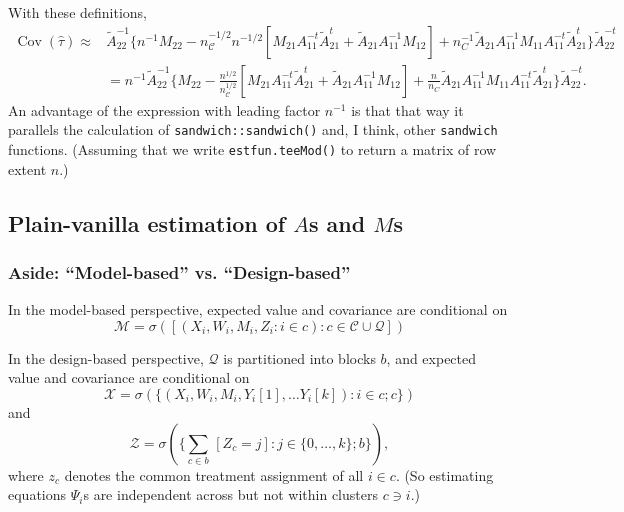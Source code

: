 \documentclass{article}
\begin{document}
With these definitions,
\begin{align}
  \operatorname{Cov}(\hat\tau) \approx& \tilde{A}_{22}^{-1}\{n^{-1} M_{22} -
                                 n_{\mathcal{C}}^{-1/2}n^{-1/2}[M_{21}A_{11}^{-t}\tilde{A}_{21}^t
                                 + \tilde{A}_{21}A_{11}^{-1}M_{12}] +
                                 n_C^{-1}\tilde{A}_{21}A_{11}^{-1}M_{11}A_{11}^{-t}\tilde{A}_{21}^{t}\}\tilde{A}_{22}^{-t}\nonumber
  \\
                               &= n^{-1}\tilde{A}_{22}^{-1}\{
                                 M_{22} -
                                 \frac{n^{1/2}}{n_{\mathcal{C}}^{1/2}}[M_{21}A_{11}^{-t}\tilde{A}_{21}^t
                                 + \tilde{A}_{21}A_{11}^{-1}M_{12}] +
                                 \frac{n}{n_C}\tilde{A}_{21}A_{11}^{-1}M_{11}A_{11}^{-t}\tilde{A}_{21}^{t}\}\tilde{A}_{22}^{-t}
                                . \label{eq:6}
\end{align}
An advantage of the expression with leading factor $n^{-1}$ is that
that way it parallels the calculation of
\texttt{sandwich::sandwich()} and, I think, other \texttt{sandwich}
functions. (Assuming that we write
\texttt{estfun.teeMod()}  to return a matrix of row extent
$n$.)

  \subsection{Plain-vanilla estimation of $A$s and $M$s}
\subsubsection {Aside: ``Model-based'' vs. ``Design-based''}\label{sec:spec-vs-mod-based}

In the model-based perspective, expected value and covariance are
conditional on
\[ \mathcal{M} = \sigma\left(\left[(X_{i}, W_{i}, M_{i}, Z_{i}: i \in c): c \in
      \mathcal{C}\cup \mathcal{Q} \right]\right)\]


In the design-based perspective, $\mathcal{Q}$ is partitioned into
blocks $b$, and expected value and covariance are
conditional on
\[\mathcal{X} = \sigma(\{(X_{i}, W_{i}, M_{i}, Y_{i}[1], \ldots Y_{i}[k]):
  i \in c; c\})\]
and
\[\mathcal{Z} = \sigma(\{\sum_{c \in b}\, \![Z_{c}=j\!] : j \in \{0, \ldots, k\}; b\} ),\]
where $z_{c}$ denotes the common treatment assignment of all $i\in
c$. (So estimating equations ${\Psi}_{i}$s are independent across but not within
clusters $c \ni i$.)
\end{document}
